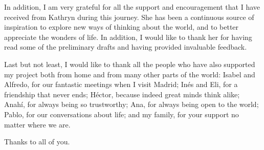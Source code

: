 \documentclass[a4paper,12pt,oneside]{report}
\newcommand\blankpage{
    \null
    \thispagestyle{empty}
    \newpage}
\begin{document}
In addition, I am very grateful for all the support and encouragement that I have received from Kathryn during this journey. She has been a continuous source of inspiration to explore new ways of thinking about the world, and to better appreciate the wonders of life. In addition, I would like to thank her for having read some of the preliminary drafts and having provided invaluable feedback.  

Last but not least, I would like to thank all the people who have also supported my project both from home and from many other parts of the world: Isabel and Alfredo, for our fantastic meetings when I visit Madrid; In\'{e}s and Eli, for a friendship that never ends; H\'{e}ctor, because indeed great minds think alike; Anah\'{i}, for always being so trustworthy; Ana, for always being open to the world; Pablo, for our conversations about life; and my family, for your support no matter where we are.  

Thanks to all of you.



\newpage
{}
\tableofcontents 
\listoftables
{}
{}
\listoffigures
{}
{}


\newpage
{}
\end{document}
